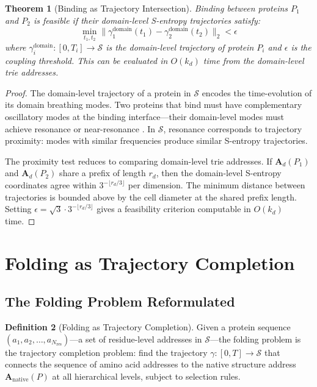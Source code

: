 \documentclass[11pt,twocolumn,a4paper]{article}
\newtheorem{theorem}{Theorem}[section]
\theoremstyle{definition}
\newtheorem{definition}[theorem]{Definition}
\theoremstyle{remark}
\newcommand{\Sspace}{\mathcal{S}}
\newcommand{\Nres}{N_{\mathrm{res}}}
\begin{document}
\begin{theorem}[Binding as Trajectory Intersection]
\label{thm:react}
Binding between proteins $P_1$ and $P_2$ is feasible if their domain-level S-entropy trajectories satisfy:
\begin{equation}
\min_{t_1, t_2} \|\gamma_1^{\mathrm{domain}}(t_1) - \gamma_2^{\mathrm{domain}}(t_2)\|_2 < \epsilon
\end{equation}
where $\gamma_i^{\mathrm{domain}}: [0, T_i] \to \Sspace$ is the domain-level trajectory of protein $P_i$ and $\epsilon$ is the coupling threshold. This can be evaluated in $O(k_d)$ time from the domain-level trie addresses.
\end{theorem}

\begin{proof}
The domain-level trajectory of a protein in $\Sspace$ encodes the time-evolution of its domain breathing modes. Two proteins that bind must have complementary oscillatory modes at the binding interface---their domain-level modes must achieve resonance or near-resonance \citep{bahar1997}. In $\Sspace$, resonance corresponds to trajectory proximity: modes with similar frequencies produce similar S-entropy trajectories.

The proximity test reduces to comparing domain-level trie addresses. If $\mathbf{A}_d(P_1)$ and $\mathbf{A}_d(P_2)$ share a prefix of length $r_d$, then the domain-level S-entropy coordinates agree within $3^{-\lfloor r_d/3 \rfloor}$ per dimension. The minimum distance between trajectories is bounded above by the cell diameter at the shared prefix length. Setting $\epsilon = \sqrt{3} \cdot 3^{-\lfloor r_d/3 \rfloor}$ gives a feasibility criterion computable in $O(k_d)$ time.
\end{proof}

\section{Folding as Trajectory Completion}
\label{sec:folding}

\subsection{The Folding Problem Reformulated}

\begin{definition}[Folding as Trajectory Completion]
\label{def:folding}
Given a protein sequence $(a_1, a_2, \ldots, a_{\Nres})$---a set of residue-level addresses in $\Sspace$---the folding problem is the trajectory completion problem: find the trajectory $\gamma: [0, T] \to \Sspace$ that connects the sequence of amino acid addresses to the native structure address $\mathbf{A}_{\mathrm{native}}(P)$ at all hierarchical levels, subject to selection rules.
\end{definition}
\end{document}
